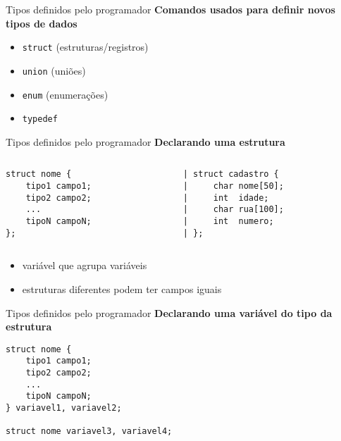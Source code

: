 \documentclass[10pt]{beamer}
\begin{document}
\begin{frame}{Tipos definidos pelo programador}
    \huge \textbf{Comandos usados para definir novos tipos de dados}
    
    \begin{itemize}
        \item \texttt{struct} (estruturas/registros)
        \item \texttt{union} (uniões)
        \item \texttt{enum} (enumerações)
        \item \texttt{typedef}
    \end{itemize}
\end{frame}

\begin{frame}[fragile]{Tipos definidos pelo programador}
    \huge
    \textbf{Declarando uma estrutura}
    
    \bigskip
    
    \large
    \begin{columns}
    \begin{column}{0.35\textwidth}
        \begin{verbatim}
struct nome {
    tipo1 campo1;
    tipo2 campo2;
    ...
    tipoN campoN;
};
        \end{verbatim}
    \end{column}
    \begin{column}{0.55\textwidth}
        \begin{verbatim}
| struct cadastro {
|     char nome[50];
|     int  idade;
|     char rua[100];
|     int  numero;
| };
        \end{verbatim}
    \end{column}
    \end{columns}

    \vfill
    
    \setlength{\leftmargini}{0pt}
    \begin{itemize}
        \item [] variável que agrupa variáveis
        \item [] estruturas diferentes podem ter campos iguais
    \end{itemize}
\end{frame}

\begin{frame}[fragile]{Tipos definidos pelo programador}
    \huge
    \textbf{Declarando uma variável do tipo da estrutura}
    
    \bigskip
    
    \large
    \begin{verbatim}
struct nome {
    tipo1 campo1;
    tipo2 campo2;
    ...
    tipoN campoN;
} variavel1, variavel2;

struct nome variavel3, variavel4;
    \end{verbatim}
    
\end{frame}
\end{document}
